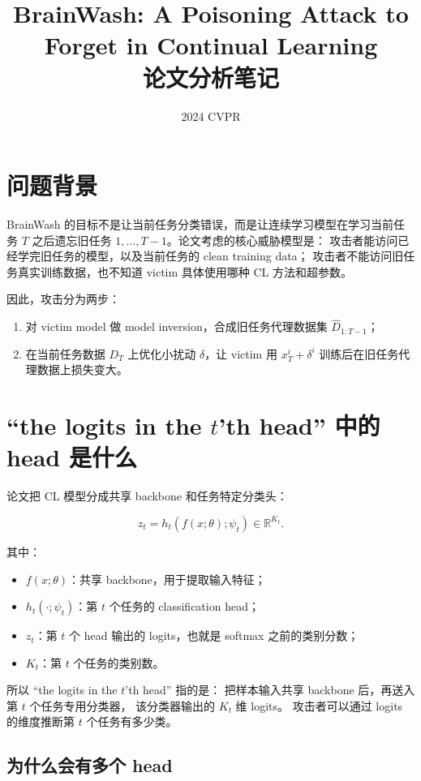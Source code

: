 \documentclass[11pt]{article}
\title{\textbf{BrainWash: A Poisoning Attack to Forget in Continual Learning}\\论文分析笔记}
\author{}
\date{2024 CVPR}
\begin{document}
\maketitle

\section{问题背景}

BrainWash 的目标不是让当前任务分类错误，而是让连续学习模型在学习当前任务
\(T\) 之后遗忘旧任务 \(1,\ldots,T-1\)。论文考虑的核心威胁模型是：
攻击者能访问已经学完旧任务的模型，以及当前任务的 clean training data；
攻击者不能访问旧任务真实训练数据，也不知道 victim 具体使用哪种 CL 方法和超参数。

因此，攻击分为两步：

\begin{enumerate}
  \item 对 victim model 做 model inversion，合成旧任务代理数据集
  \(\hat{D}_{1:T-1}\)；
  \item 在当前任务数据 \(D_T\) 上优化小扰动 \(\delta\)，让 victim 用
  \(x_T^i+\delta^i\) 训练后在旧任务代理数据上损失变大。
\end{enumerate}

\section{``the logits in the \(t\)'th head'' 中的 head 是什么}

论文把 CL 模型分成共享 backbone 和任务特定分类头：

\[
z_t
=
h_t(f(x;\theta);\psi_t)
\in \mathbb{R}^{K_t}.
\]

其中：

\begin{itemize}
  \item \(f(x;\theta)\)：共享 backbone，用于提取输入特征；
  \item \(h_t(\cdot;\psi_t)\)：第 \(t\) 个任务的 classification head；
  \item \(z_t\)：第 \(t\) 个 head 输出的 logits，也就是 softmax 之前的类别分数；
  \item \(K_t\)：第 \(t\) 个任务的类别数。
\end{itemize}

所以 ``the logits in the \(t\)'th head'' 指的是：
把样本输入共享 backbone 后，再送入第 \(t\) 个任务专用分类器，
该分类器输出的 \(K_t\) 维 logits。
攻击者可以通过 logits 的维度推断第 \(t\) 个任务有多少类。

\subsection{为什么会有多个 head}
\end{document}
